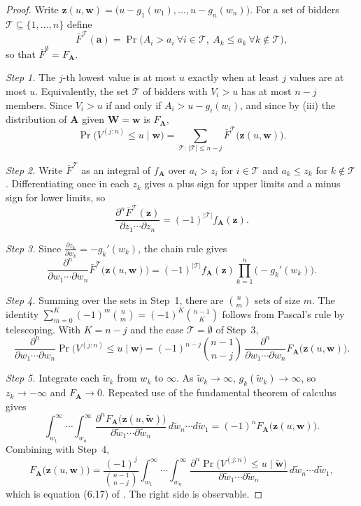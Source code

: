 \begin{proof}
Write $\bm z(u,\bm w)=\big(u-g_1(w_1),\dots,u-g_n(w_n)\big)$. For a set of bidders $\mathcal T\subseteq\{1,\dots,n\}$
define
\[
\bar F^{\mathcal T}(\bm a)=\Pr\big(A_i>a_i\ \forall i\in\mathcal T,\ A_k\le a_k\ \forall k\notin\mathcal T\big),
\]
so that $\bar F^{\emptyset}=F_{\bm A}$.

\emph{Step 1.} The $j$-th lowest value is at most $u$ exactly when at least $j$ values are at most $u$. Equivalently,
the set $\mathcal T$ of bidders with $V_i>u$ has at most $n-j$ members. Since $V_i>u$ if and only if
$A_i>u-g_i(w_i)$, and since by (iii) the distribution of $\bm A$ given $\bm W=\bm w$ is $F_{\bm A}$,
\[
\Pr\big(V^{(j:n)}\le u\mid\bm w\big)=\sum_{\mathcal T:\,|\mathcal T|\le n-j}\bar F^{\mathcal T}\big(\bm z(u,\bm w)\big).
\]

\emph{Step 2.} Write $\bar F^{\mathcal T}$ as an integral of $f_{\bm A}$ over $a_i>z_i$ for $i\in\mathcal T$ and
$a_k\le z_k$ for $k\notin\mathcal T$. Differentiating once in each $z_k$ gives a plus sign for upper limits and a
minus sign for lower limits, so
\[
\frac{\partial^n\bar F^{\mathcal T}(\bm z)}{\partial z_1\cdots\partial z_n}=(-1)^{|\mathcal T|}f_{\bm A}(\bm z).
\]

\emph{Step 3.} Since $\frac{\partial z_k}{\partial w_k}=-g_k'(w_k)$, the chain rule gives
\[
\frac{\partial^n}{\partial w_1\cdots\partial w_n}\bar F^{\mathcal T}\big(\bm z(u,\bm w)\big)
=(-1)^{|\mathcal T|}f_{\bm A}(\bm z)\prod_{k=1}^n\big(-g_k'(w_k)\big).
\]

\emph{Step 4.} Summing over the sets in Step~1, there are $\binom{n}{m}$ sets of size $m$. The identity
$\sum_{m=0}^{K}(-1)^m\binom nm=(-1)^K\binom{n-1}{K}$ follows from Pascal's rule by telescoping. With $K=n-j$ and the
case $\mathcal T=\emptyset$ of Step~3,
\[
\frac{\partial^n}{\partial w_1\cdots\partial w_n}\Pr\big(V^{(j:n)}\le u\mid\bm w\big)
=(-1)^{n-j}\binom{n-1}{n-j}\,\frac{\partial^n}{\partial w_1\cdots\partial w_n}F_{\bm A}\big(\bm z(u,\bm w)\big).
\]

\emph{Step 5.} Integrate each $\tilde w_k$ from $w_k$ to $\infty$. As $\tilde w_k\to\infty$, $g_k(\tilde w_k)\to\infty$, so
$z_k\to-\infty$ and $F_{\bm A}\to0$. Repeated use of the fundamental theorem of calculus gives
\[
\int_{w_1}^{\infty}\!\!\cdots\int_{w_n}^{\infty}\frac{\partial^nF_{\bm A}\big(\bm z(u,\tilde{\bm w})\big)}{\partial\tilde w_1\cdots\partial\tilde w_n}\,
d\tilde w_n\cdots d\tilde w_1=(-1)^nF_{\bm A}\big(\bm z(u,\bm w)\big).
\]
Combining with Step~4,
\[
F_{\bm A}\big(\bm z(u,\bm w)\big)=\frac{(-1)^j}{\binom{n-1}{n-j}}\int_{w_1}^{\infty}\!\!\cdots\int_{w_n}^{\infty}
\frac{\partial^n\Pr\big(V^{(j:n)}\le u\mid\tilde{\bm w}\big)}{\partial\tilde w_1\cdots\partial\tilde w_n}\,d\tilde w_n\cdots d\tilde w_1 ,
\]
which is equation (6.17) of \citet{AtheyHaile2007}. The right side is observable.


\end{proof}

